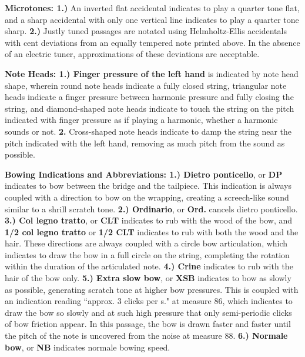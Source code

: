 \documentclass[10pt]{article}
\begin{document}
\begingroup
\textbf{Microtones: 1.)} An inverted flat accidental indicates to play a quarter tone flat, and a sharp accidental with only one vertical line indicates to play a quarter tone sharp. \textbf{2.)} Justly tuned passages are notated using Helmholtz-Ellis accidentals with cent deviations from an equally tempered note printed above. In the absence of an electric tuner, approximations of these deviations are acceptable. \\
\endgroup

\begingroup
\textbf{Note Heads: 1.) Finger pressure of the left hand} is indicated by note head shape, wherein round note heads indicate a fully closed string, triangular note heads indicate a finger pressure between harmonic pressure and fully closing the string, and diamond-shaped note heads indicate to touch the string on the pitch indicated with finger pressure as if playing a harmonic, whether a harmonic sounds or not. \textbf{2.} Cross-shaped note heads indicate to damp the string near the pitch indicated with the left hand, removing as much pitch from the sound as possible. \\
\endgroup

\begingroup
\textbf{Bowing Indications and Abbreviations: 1.) Dietro ponticello}, or \textbf{DP} indicates to bow between the bridge and the tailpiece. This indication is always coupled with a direction to bow on the wrapping, creating a screech-like sound similar to a shrill scratch tone. \textbf{2.) Ordinario}, or \textbf{Ord.} cancels dietro ponticello. \textbf{3.) Col legno tratto}, or \textbf{CLT} indicates to rub with the wood of the bow, and \textbf{1/2 col legno tratto} or \textbf{1/2 CLT} indicates to rub with both the wood and the hair. These directions are always coupled with a circle bow articulation, which indicates to draw the bow in a full circle on the string, completing the rotation within the duration of the articulated note. \textbf{4.) Crine} indicates to rub with the hair of the bow only. \textbf{5.) Extra slow bow}, or \textbf{XSB} indicates to bow as slowly as possible, generating scratch tone at higher bow pressures. This is coupled with an indication reading ``approx. 3 clicks per s." at measure 86, which indicates to draw the bow so slowly and at such high pressure that only semi-periodic clicks of bow friction appear. In this passage, the bow is drawn faster and faster until the pitch of the note is uncovered from the noise at measure 88. \textbf{6.) Normale bow}, or \textbf{NB} indicates normale bowing speed.  \\
\endgroup
\end{document}
